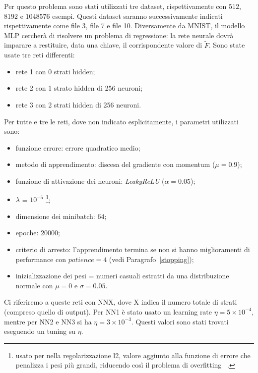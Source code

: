 \documentclass[11pt,a4paper,twoside,
openright]{book}
\begin{document}
Per questo problema sono stati utilizzati tre dataset, rispettivamente con $512$, $8192$ e $1048576$ esempi. Questi dataset saranno successivamente indicati rispettivamente come file 3, file 7 e file 10.
Diversamente da MNIST, il modello MLP cercherà di risolvere un problema di regressione: la rete neurale dovrà imparare a restituire, data una chiave, il corrispondente valore di $\tilde{F}$.
Sono state usate tre reti differenti:
\begin{itemize}
\item{rete 1 con 0 strati hidden};
\item{rete 2 con 1 strato hidden di 256 neuroni};
\item{rete 3 con 2 strati hidden di 256 neuroni}.
\end{itemize}
Per tutte e tre le reti, dove non indicato esplicitamente, i parametri utilizzati sono:
\begin{itemize}
\item funzione errore: errore quadratico medio;
\item metodo di apprendimento: discesa del gradiente con momentum ($\mu=0.9$);
\item funzione di attivazione dei neuroni: \textit{LeakyReLU} ($\alpha=0.05$);
\item{$\lambda$} = $10^{-5}$ \footnote{usato per nella regolarizzazione l2, valore aggiunto alla funzione di errore che penalizza i pesi più grandi, riducendo così il problema di overfitting ~\cite{L2}.};
\item{dimensione dei minibatch}: $64$;
\item{epoche}: $20000$;
\item{criterio di arresto}: l'apprendimento termina se non si hanno miglioramenti di performance con $\textit{patience}=4$ (vedi Paragrafo~\ref{stopping});
\item inizializzazione dei pesi = numeri casuali estratti da una distribuzione normale con $\mu=0$ e $\sigma= 0.05$. 
\end{itemize}
Ci riferiremo a queste reti con NNX, dove X indica il numero totale di strati (compreso quello di output).
Per NN1 è stato usato un learning rate $\eta=5 \times 10^{-4}$, mentre per NN2 e NN3 si ha $\eta=3 \times 10^{-3}$. Questi valori sono stati trovati eseguendo un tuning su $\eta$.
\end{document}
